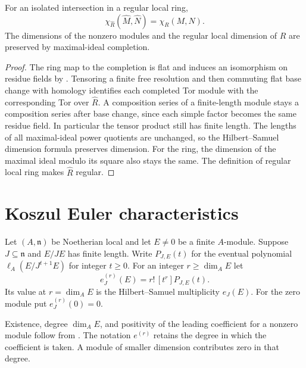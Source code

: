 \begin{proposition}\label{res:I03}
For an isolated intersection in a regular local ring,
\[
 \chi_{\widehat R}(\widehat M,\widehat N)=\chi_R(M,N).
\]
The dimensions of the nonzero modules and the regular local dimension
of \(R\) are preserved by maximal-ideal completion.
\end{proposition}
\begin{proof}
The ring map to the completion is flat and induces an isomorphism on
residue fields by \cite[ALG-05-C04-S01]{p103}. Tensoring a finite free
resolution and then commuting flat base change with homology identifies
each completed Tor module with the corresponding Tor over
\(\widehat R\). A composition series of a finite-length module stays a
composition series after base change, since each simple factor becomes
the same residue field. In particular the tensor product still has
finite length. The lengths of all maximal-ideal power quotients are
unchanged, so the Hilbert--Samuel dimension formula
\cite[ALG-05-C03-S02]{p103} preserves dimension. For the ring, the
dimension of the maximal ideal modulo its square also stays the same.
The definition of regular local ring makes \(\widehat R\) regular.
\end{proof}

\section{Koszul Euler characteristics}

\begin{definition}\label{res:I04}
Let \((A,\mathfrak n)\) be Noetherian local and let \(E\ne 0\) be a
finite \(A\)-module. Suppose \(J\subseteq\mathfrak n\) and \(E/JE\)
has finite length. Write \(P_{J,E}(t)\) for the eventual polynomial
\(\ell_A(E/J^{t+1}E)\) for integer \(t\ge 0\). For an integer
\(r\ge\dim_A E\) let
\[
 e^{(r)}_J(E)=r!\,[t^r]P_{J,E}(t).
\]
Its value at \(r=\dim_A E\) is the Hilbert--Samuel multiplicity
\(e_J(E)\). For the zero module put \(e^{(r)}_J(0)=0\).
\end{definition}

Existence, degree \(\dim_A E\), and positivity of the leading
coefficient for a nonzero module follow from
\cite[ALG-05-C03-S02]{p103}. The notation \(e^{(r)}\) retains the
degree in which the coefficient is taken. A module of smaller
dimension contributes zero in that degree.

